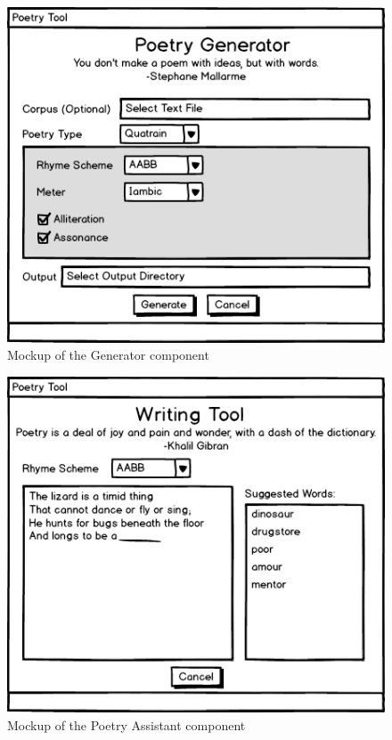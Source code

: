 \documentclass[10pt, letter,twocolumn]{IEEEtran}
\begin{document}
\begin{figure}[ht]
  \centering
    \includegraphics[scale=0.5]{Images/generate}
    \caption{Mockup of the Generator component}
  \label{gui3}
\end{figure}

\begin{figure}[ht]
  \centering
    \includegraphics[scale=0.5]{Images/tool}
    \caption{Mockup of the Poetry Assistant component}
  \label{gui4}
\end{figure}



\end{document}
